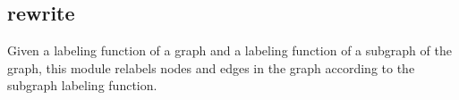 


    \subsection*{rewrite}
    Given a labeling function of a graph and a labeling function of a subgraph of the graph, this module relabels nodes and edges in the graph according to the subgraph labeling function.

